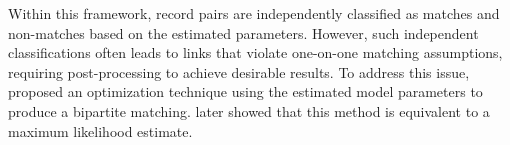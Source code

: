 \documentclass[ba]{imsart}
\begin{document}

Within this framework, record pairs are independently classified as matches and non-matches based on the estimated parameters. However, such independent classifications often leads to links that violate one-on-one matching assumptions, requiring post-processing to achieve desirable results. To address this issue, \cite{jaro1989} proposed an optimization technique using the estimated model parameters to produce a bipartite matching. \cite{sadinle_bayesian_2017} later showed that this method is equivalent to a maximum likelihood estimate.




%
\end{document}
